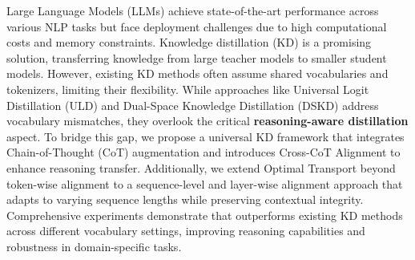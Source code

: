 Large Language Models (LLMs) achieve state-of-the-art performance across various NLP tasks but face deployment challenges due to high computational costs and memory constraints. Knowledge distillation (KD) is a promising solution, transferring knowledge from large teacher models to smaller student models. However, existing KD methods often assume shared vocabularies and tokenizers, limiting their flexibility. While approaches like Universal Logit Distillation (ULD) and Dual-Space Knowledge Distillation (DSKD) address vocabulary mismatches, they overlook the critical \textbf{reasoning-aware distillation} aspect. To bridge this gap, we propose \method a universal KD framework that integrates Chain-of-Thought (CoT) augmentation and introduces Cross-CoT Alignment to enhance reasoning transfer. Additionally, we extend Optimal Transport beyond token-wise alignment to a sequence-level and layer-wise alignment approach that adapts to varying sequence lengths while preserving contextual integrity. Comprehensive experiments demonstrate that \method outperforms existing KD methods across different vocabulary settings, improving reasoning capabilities and robustness in domain-specific tasks.

